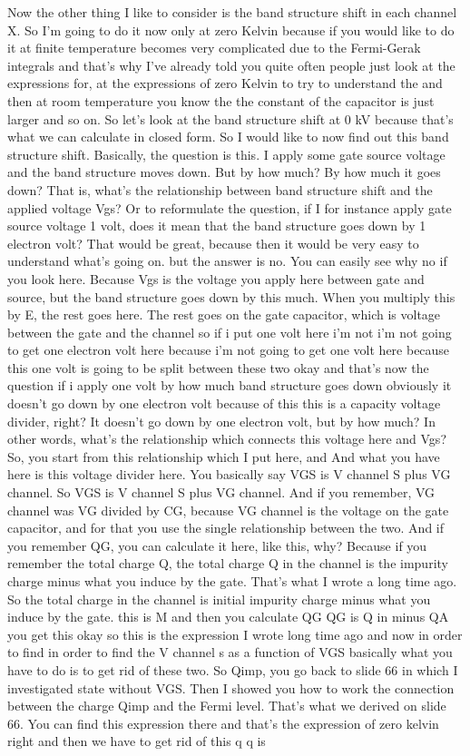 Now the other thing I like to consider is the band structure shift in each channel X. So I'm going to do it now only at zero Kelvin because if you would like to do it at finite temperature becomes very complicated due to the Fermi-Gerak integrals and that's why I've already told you quite often people just look at the expressions for, at the expressions of zero Kelvin to try to understand the and then at room temperature you know the the constant of the capacitor is just larger and so on. So let's look at the band structure shift at 0 kV because that's what we can calculate in closed form. So I would like to now find out this band structure shift. Basically, the question is this. I apply some gate source voltage and the band structure moves down. But by how much? By how much it goes down? That is, what's the relationship between band structure shift and the applied voltage Vgs? Or to reformulate the question, if I for instance apply gate source voltage 1 volt, does it mean that the band structure goes down by 1 electron volt? That would be great, because then it would be very easy to understand what's going on. but the answer is no. You can easily see why no if you look here. Because Vgs is the voltage you apply here between gate and source, but the band structure goes down by this much. When you multiply this by E, the rest goes here. The rest goes on the gate capacitor, which is voltage between the gate and the channel so if i put one volt here i'm not i'm not going to get one electron volt here because i'm not going to get one volt here because this one volt is going to be split between these two okay and that's now the question if i apply one volt by how much band structure goes down obviously it doesn't go down by one electron volt because of this this is a capacity voltage divider, right? It doesn't go down by one electron volt, but by how much? In other words, what's the relationship which connects this voltage here and Vgs? So, you start from this relationship which I put here, and And what you have here is this voltage divider here. You basically say VGS is V channel S plus VG channel. So VGS is V channel S plus VG channel. And if you remember, VG channel was VG divided by CG, because VG channel is the voltage on the gate capacitor, and for that you use the single relationship between the two. And if you remember QG, you can calculate it here, like this, why? Because if you remember the total charge Q, the total charge Q in the channel is the impurity charge minus what you induce by the gate. That's what I wrote a long time ago. So the total charge in the channel is initial impurity charge minus what you induce by the gate. this is M and then you calculate QG QG is Q in minus QA you get this okay so this is the expression I wrote long time ago and now in order to find in order to find the V channel s as a function of VGS basically what you have to do is to get rid of these two. So Qimp, you go back to slide 66 in which I investigated state without VGS. Then I showed you how to work the connection between the charge Qimp and the Fermi level. That's what we derived on slide 66. You can find this expression there and that's the expression of zero kelvin right and then we have to get rid of this q q is 
